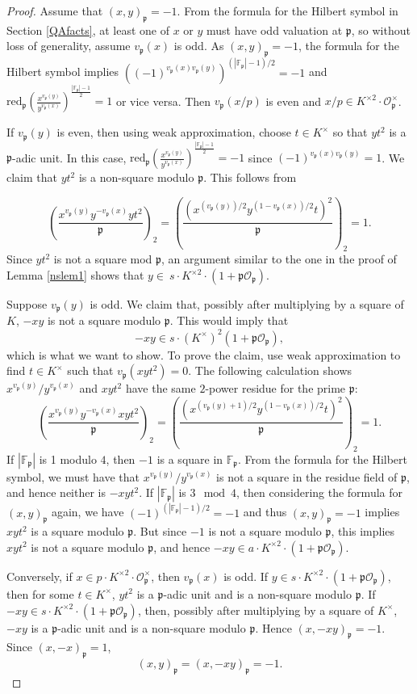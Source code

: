 \documentclass[12pt,reqno]{amsart}
\newcommand{\OO}{\mathcal{O}}
\newcommand{\FF}{\mathbb{F}}
\newcommand{\pp}{\mathfrak{p}}
\theoremstyle{definition}
\begin{document}
\begin{proof}



Assume that $(x,y)_{\pp}=-1$. From the formula for the Hilbert symbol in Section \ref{QAfacts}, at least one of $x$ or $y$ must have odd valuation at $\pp$, so without loss of generality, assume $v_{\pp}(x)$ is odd. As $(x,y)_{\pp}=-1$, the formula for the Hilbert symbol implies $((-1)^{v_{\pp}(x)v_{\pp}(y)})^{(|\FF_{\pp}|-1)/2}=-1$ and $\text{red}_{\pp}\left(\frac{x^{v_{\pp}(y)}}{y^{v_{\pp}(x)}}\right)^{\frac{|\FF_{\pp}|-1}{2}}
=1$ or vice versa. Then $v_{\pp}(x/p)$ is even and $x/p\in K^{\times2}\cdot \OO_{\pp}^{\times}$.

 If $v_{\pp}(y)$ is even, then using weak approximation, choose $t\in K^{\times}$ so that $yt^2$ is a $\pp$-adic unit. In this case, 
$\text{red}_{\pp}\left(\frac{x^{v_{\pp}(y)}}{y^{v_{\pp}(x)}}\right)^{\frac{|\FF_{\pp}|-1}{2}}=-1$ since $(-1)^{v_{\pp}(x)v_{\pp}(y)}=1$.
We claim that $yt^2$ is a non-square modulo $\pp$. This follows from 

\[
\left(\frac{x^{v_{\pp}(y)}y^{-v_{\pp}(x)}yt^2}{\pp}\right)_2=\left(\frac{(x^{(v_{\pp}(y))/2}y^{(1-v_{\pp}(x))/2}t)^2}{\pp}\right)_2=1.
\]
Since $yt^2$ is not a square mod $\pp$, an argument similar to the one in the proof of Lemma \ref{nslem1} shows that $y\in ~s\cdot K^{\times2}\cdot(1+\pp\OO_{\pp})$. 

 Suppose $v_{\pp}(y)$ is odd. We claim that, possibly after multiplying by a square of $K$, $-xy$ is not a square modulo $\pp$. This would imply that
\[
-xy\in s\cdot(K^{\times})^2(1+\pp\OO_{\pp}),
\] 
which is what we want to show. To prove the claim, use weak approximation to find $t\in K^{\times}$ such that $v_{\pp}(xyt^2)=0$. The following calculation shows $x^{v_{\pp}(y)}/y^{v_{\pp}(x)}$ and  $xyt^2$ have the same $2$-power residue for the prime $\pp$:
\[
\left(\frac{x^{v_{\pp}(y)}y^{-v_{\pp}(x)}xyt^2}{\pp}\right)_2=\left(\frac{(x^{(v_{\pp}(y)+1)/2}y^{(1-v_{\pp}(x))/2}t)^2}{\pp}\right)_2=1.
\]
 If $|\FF_{\pp}|$ is 1 modulo $4$, then $-1$ is a square in $\FF_\pp$. From the formula for the Hilbert symbol, we must have that $x^{v_{\pp}(y)}/y^{v_{\pp}(x)}$ is not a square in the residue field of $\pp$, and hence neither is $-xyt^2$. If $|\FF_{\pp}|$ is $3 \mod 4$, then considering the formula for $(x,y)_{\pp}$ again, we have $(-1)^{(|\FF_{\pp}|-1)/2}=-1$ and thus $(x,y)_{\pp}=-1$ implies $xyt^2$ is a square modulo $\pp$. But since $-1$ is not a square modulo $\pp$, this implies $xyt^2$ is not a square modulo $\pp$, and hence $-xy\in a\cdot K^{\times2}\cdot(1+\pp\OO_{\pp})$.

Conversely, if $x\in p\cdot K^{\times2}\cdot\OO_{\pp}^{\times}$, then $v_{\pp}(x)$ is odd. If $y\in s\cdot K^{\times2}  \cdot(1+\pp\OO_{\pp})$, then for some $t\in K^{\times}$, $yt^2$ is a $\pp$-adic unit and is a non-square modulo $\pp$. If $-xy\in s\cdot K^{\times2}  \cdot(1+\pp\OO_{\pp})$, then, possibly after multiplying by a square of $K^{\times}$, $-xy$ is a $\pp$-adic unit and is a non-square modulo $\pp$. Hence $(x,-xy)_{\pp}=-1$. Since $(x,-x)_{\pp}=1$,
\[
(x,y)_{\pp}=(x,-xy)_{\pp}=-1.
\]
\end{proof}
\end{document}
